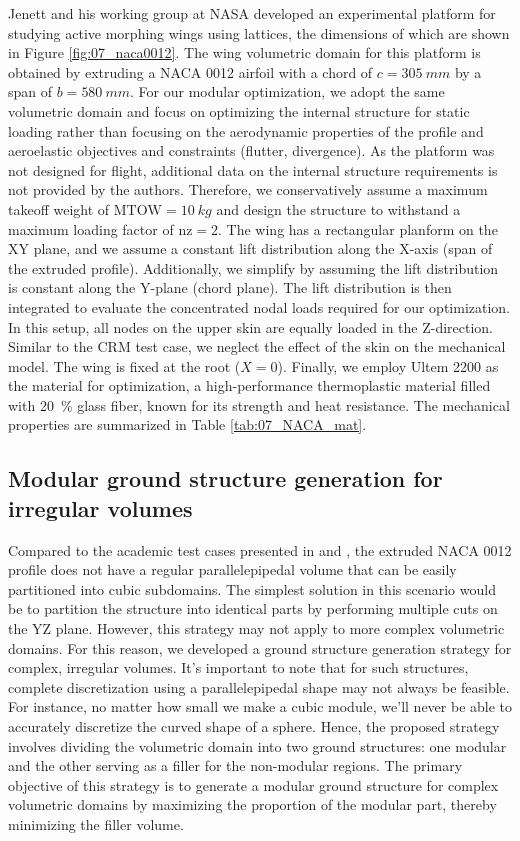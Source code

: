 Jenett and his working group at NASA developed an experimental platform for studying active morphing wings using lattices, the dimensions of which are shown in Figure \ref{fig:07_naca0012}. The wing volumetric domain for this platform is obtained by extruding a NACA 0012 airfoil with a chord of $c=\qty{305}{mm}$ by a span of $b=\qty{580}{mm}$. For our modular optimization, we adopt the same volumetric domain and focus on optimizing the internal structure for static loading rather than focusing on the aerodynamic properties of the profile and aeroelastic objectives and constraints (flutter, divergence). As the platform was not designed for flight, additional data on the internal structure requirements is not provided by the authors. Therefore, we conservatively assume a maximum takeoff weight of $\text{MTOW}=\qty{10}{kg}$ and design the structure to withstand a maximum loading factor of $\text{nz}=2$. The wing has a rectangular planform on the XY plane, and we assume a constant lift distribution along the X-axis (span of the extruded profile). Additionally, we simplify by assuming the lift distribution is constant along the Y-plane (chord plane). The lift distribution is then integrated to evaluate the concentrated nodal loads required for our optimization. In this setup, all nodes on the upper skin are equally loaded in the Z-direction. Similar to the CRM test case, we neglect the effect of the skin on the mechanical model. The wing is fixed at the root ($X=0$). Finally, we employ Ultem 2200 as the material for optimization, a high-performance thermoplastic material filled with \qty{20}{\percent} glass fiber, known for its strength and heat resistance. The mechanical properties are summarized in Table \ref{tab:07_NACA_mat}.

\subsection{Modular ground structure generation for irregular volumes}
Compared to the academic test cases presented in  and , the extruded NACA 0012 profile does not have a regular parallelepipedal volume that can be easily partitioned into cubic subdomains. The simplest solution in this scenario would be to partition the structure into identical parts by performing multiple cuts on the YZ plane. However, this strategy may not apply to more complex volumetric domains. For this reason, we developed a ground structure generation strategy for complex, irregular volumes. It's important to note that for such structures, complete discretization using a parallelepipedal shape may not always be feasible. For instance, no matter how small we make a cubic module, we'll never be able to accurately discretize the curved shape of a sphere. Hence, the proposed strategy involves dividing the volumetric domain into two ground structures: one modular and the other serving as a filler for the non-modular regions. The primary objective of this strategy is to generate a modular ground structure for complex volumetric domains by maximizing the proportion of the modular part, thereby minimizing the filler volume.

